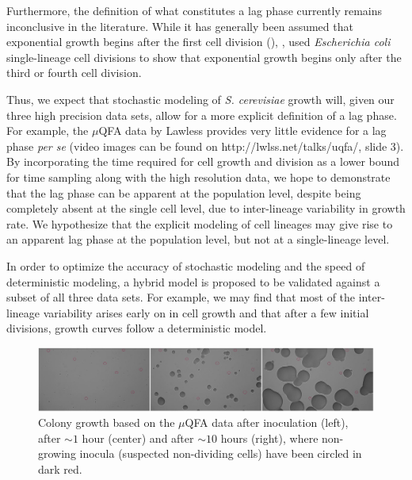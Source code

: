 \documentclass{bioinfo}
\begin{document}
Furthermore, the definition of what constitutes a lag phase currently remains inconclusive in the literature. While it has generally been assumed that exponential growth begins after the first cell division (\citealp{Baty04}), \citealp{Pin06}, used \textit{Escherichia coli} single-lineage cell divisions to show that exponential growth begins only after the third or fourth cell division.

Thus, we expect that stochastic modeling of \textit{S. cerevisiae} growth will, given our three high precision data sets, allow for a more explicit definition of a lag phase. For example, the $\mu$QFA data by Lawless provides very little evidence for a lag phase \textit{per se} (video images can be found on http://lwlss.net/talks/uqfa/, slide 3). By incorporating the time required for cell growth and division as a lower bound for time sampling along with the high resolution data, we hope to demonstrate that the lag phase can be apparent at the population level, despite being completely absent at the single cell level, due to inter-lineage variability in growth rate. We hypothesize that the explicit modeling of cell lineages may give rise to an apparent lag phase at the population level, but not at a single-lineage level. 

In order to optimize the accuracy of stochastic modeling and the speed of deterministic modeling, a hybrid model is proposed to be validated against a subset of all three data sets. For example, we may find that most of the inter-lineage variability arises early on in cell growth and that after a few initial divisions, growth curves follow a deterministic model. 

\begin{figure}[ht!]
\centering
\includegraphics[width=1\linewidth]{NonDividingCells.jpg}
\caption{Colony growth based on the $\mu$QFA data after inoculation (left), after $\sim 1$ hour (center) and after $\sim 10$ hours (right), where non-growing inocula (suspected non-dividing cells) have been circled in dark red.}
\label{fig:NonDividingCells}
\vspace{-2em}
\end{figure}
\end{document}
